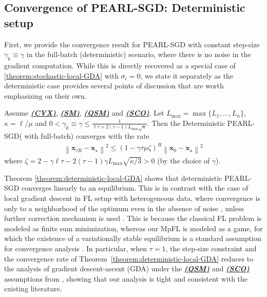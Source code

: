 \documentclass{article}
\newcommand{\algname}[1]{{\color{PineGreen}\sf  #1}\xspace}
\newcommand{\vx}{{\mathbf{x}}}
\newcommand{\sqnorm}[1]{\left\| #1 \right\|^2}
\newcommand{\abbvname}{\algname{PEARL-SGD}}
\theoremstyle{plain}
\theoremstyle{remark}
\begin{document}
\subsection{Convergence of \abbvname: Deterministic setup}
\label{section:convergence-deterministic}

First, we provide the convergence result for \abbvname with constant step-size $\gamma_k \equiv \gamma$ in the full-batch (deterministic) scenario, where there is no noise in the gradient computation.
While this is directly recovered as a special case of \cref{theorem:stochastic-local-GDA} with $\sigma_i = 0$, we state it separately as the deterministic case provides several points of discussion that are worth emphasizing on their own.

\begin{theorem}
\label{theorem:deterministic-local-GDA}
Assume \hyperref[assumption:convexity]{\textbf{\emph{(CVX)}}}, \hyperref[assumption:smoothness]{\textbf{\emph{(SM)}}}, \hyperref[assumption:quasi-strong-monotonicity]
{\textbf{\emph{(QSM)}}} and \hyperref[assumption:star-cocoercivity]{\textbf{\emph{(SCO)}}}.
Let $L_{\mathrm{max}} = \max\{L_1, \dots, L_n\}$, $\kappa = \ell/\mu$ and $0 < \gamma_k \equiv \gamma \le \frac{1}{\ell\tau + 2(\tau - 1) L_{\mathrm{max}} \sqrt{\kappa}}$.
Then the Deterministic \abbvname ( with full-batch) converges with the rate
\begin{align*}
    \sqnorm{\vx_{\tau R} - \vx_\star} \le \left( 1 - \gamma\tau\mu \zeta \right)^R \sqnorm{\vx_0 - \vx_\star}
\end{align*}
where $\zeta = 2 - \gamma \ell\tau - 2(\tau - 1)\gamma L_{\mathrm{max}} \sqrt{\kappa/3} > 0$ (by the choice of $\gamma$).
\end{theorem}

Theorem \ref{theorem:deterministic-local-GDA} shows that deterministic \abbvname converges linearly to an equilibrium. 
This is in contrast with the case of local gradient descent in FL setup with heterogeneous data, where convergence is only to a neighborhood of the optimum even in the absence of noise \citep{KhaledMishchenkoRichtarik2020_tighter}, unless further correction mechanism is used \citep{MishchenkoMalinovskyStichRichtarik2022_proxskip}.
This is because the classical FL problem is modeled as finite sum minimization, whereas our MpFL is modeled as a game, for which the existence of a variationally stable equilibrium is a standard assumption for convergence analysis \citep{bravo2018bandit, mertikopoulos2019learning, LoizouBerardGidelMitliagkasLacoste-Julien2021_stochastic, mertikopoulos2024unified}.
In particular, when $\tau = 1$, the step-size constraint and the convergence rate of Theorem~\ref{theorem:deterministic-local-GDA} reduces to the analysis of gradient descent-ascent (GDA) under the \hyperref[assumption:quasi-strong-monotonicity]{\textbf{\textit{(QSM)}}} and \hyperref[assumption:star-cocoercivity]{\textbf{\textit{(SCO)}}} assumptions from \citep{LoizouBerardGidelMitliagkasLacoste-Julien2021_stochastic}, showing that our analysis is tight and consistent with the existing literature.
\end{document}
